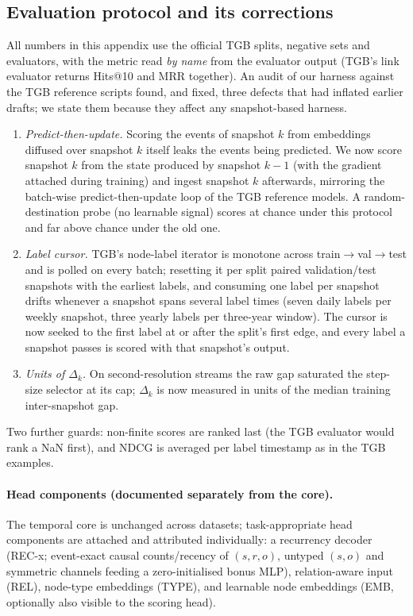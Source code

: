 \subsection{Evaluation protocol and its corrections}
\label{app:faithful:protocol}

All numbers in this appendix use the official TGB splits, negative sets and
evaluators, with the metric read \emph{by name} from the evaluator output
(TGB's link evaluator returns Hits@10 and MRR together). An audit of our
harness against the TGB reference scripts found, and fixed, three defects
that had inflated earlier drafts; we state them because they affect any
snapshot-based harness.
\begin{enumerate}
\item \emph{Predict-then-update.} Scoring the events of snapshot $k$ from
embeddings diffused over snapshot $k$ itself leaks the events being
predicted. We now score snapshot $k$ from the state produced by snapshot
$k{-}1$ (with the gradient attached during training) and ingest snapshot
$k$ afterwards, mirroring the batch-wise predict-then-update loop of the
TGB reference models. A random-destination probe (no learnable signal)
scores at chance under this protocol and far above chance under the old one.
\item \emph{Label cursor.} TGB's node-label iterator is monotone across
train$\to$val$\to$test and is polled on every batch; resetting it per split
paired validation/test snapshots with the earliest labels, and consuming one
label per snapshot drifts whenever a snapshot spans several label times
(seven daily labels per weekly snapshot, three yearly labels per three-year
window). The cursor is now seeked to the first label at or after the split's
first edge, and every label a snapshot passes is scored with that
snapshot's output.
\item \emph{Units of $\Delta_k$.} On second-resolution streams the raw gap
saturated the step-size selector at its cap; $\Delta_k$ is now measured in
units of the median training inter-snapshot gap.
\end{enumerate}
Two further guards: non-finite scores are ranked last (the TGB evaluator
would rank a NaN first), and NDCG is averaged per label timestamp as in the
TGB examples.

\paragraph{Head components (documented separately from the core).}
The temporal core is unchanged across datasets; task-appropriate head
components are attached and attributed individually: a recurrency decoder
(REC-x; event-exact causal counts/recency of $(s,r,o)$, untyped $(s,o)$ and
symmetric channels feeding a zero-initialised bonus MLP), relation-aware
input (REL), node-type embeddings (TYPE), and learnable node embeddings
(EMB, optionally also visible to the scoring head).

